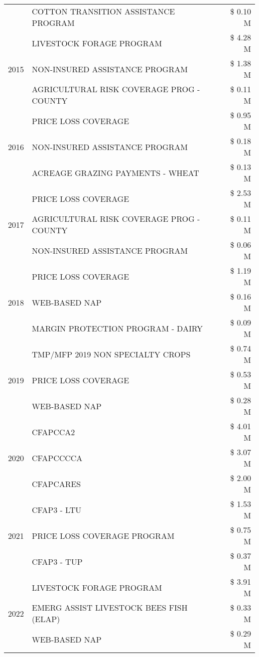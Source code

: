 \begin{tabular}{llr}
 & COTTON TRANSITION ASSISTANCE PROGRAM & \$ 0.10 M \\
\cline{1-3}
\multirow[t]{3}{*}{2015} & LIVESTOCK FORAGE PROGRAM & \$ 4.28 M \\
 & NON-INSURED ASSISTANCE PROGRAM & \$ 1.38 M \\
 & AGRICULTURAL RISK COVERAGE PROG - COUNTY & \$ 0.11 M \\
\cline{1-3}
\multirow[t]{3}{*}{2016} & PRICE LOSS COVERAGE & \$ 0.95 M \\
 & NON-INSURED ASSISTANCE PROGRAM & \$ 0.18 M \\
 & ACREAGE GRAZING PAYMENTS - WHEAT & \$ 0.13 M \\
\cline{1-3}
\multirow[t]{3}{*}{2017} & PRICE LOSS COVERAGE & \$ 2.53 M \\
 & AGRICULTURAL RISK COVERAGE PROG - COUNTY & \$ 0.11 M \\
 & NON-INSURED ASSISTANCE PROGRAM & \$ 0.06 M \\
\cline{1-3}
\multirow[t]{3}{*}{2018} & PRICE LOSS COVERAGE & \$ 1.19 M \\
 & WEB-BASED NAP & \$ 0.16 M \\
 & MARGIN PROTECTION PROGRAM - DAIRY & \$ 0.09 M \\
\cline{1-3}
\multirow[t]{3}{*}{2019} & TMP/MFP 2019 NON SPECIALTY CROPS & \$ 0.74 M \\
 & PRICE LOSS COVERAGE & \$ 0.53 M \\
 & WEB-BASED NAP & \$ 0.28 M \\
\cline{1-3}
\multirow[t]{3}{*}{2020} & CFAPCCA2 & \$ 4.01 M \\
 & CFAPCCCCA & \$ 3.07 M \\
 & CFAPCARES & \$ 2.00 M \\
\cline{1-3}
\multirow[t]{3}{*}{2021} & CFAP3 - LTU & \$ 1.53 M \\
 & PRICE LOSS COVERAGE PROGRAM & \$ 0.75 M \\
 & CFAP3 - TUP & \$ 0.37 M \\
\cline{1-3}
\multirow[t]{3}{*}{2022} & LIVESTOCK FORAGE PROGRAM & \$ 3.91 M \\
 & EMERG ASSIST LIVESTOCK BEES FISH (ELAP) & \$ 0.33 M \\
 & WEB-BASED NAP & \$ 0.29 M \\
\cline{1-3}
\bottomrule
\end{tabular}
